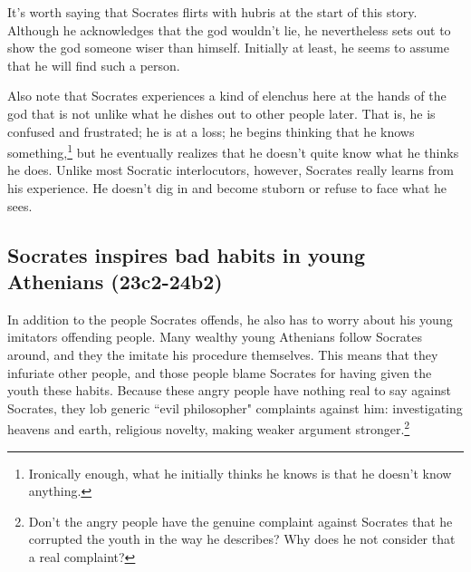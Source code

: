 \documentclass[11pt]{article}
\begin{document}
It's worth saying that Socrates flirts with hubris at the start of this
story.  Although he acknowledges that the god wouldn't lie, he nevertheless
sets out to show the god someone wiser than himself.  Initially at least,
he seems to assume that he will find such a person.

Also note that Socrates experiences a kind of elenchus here at the hands of
the god that is not unlike what he dishes out to other people later. That
is, he is confused and frustrated; he is at a loss; he begins thinking that
he knows something,\footnote{Ironically enough, what he initially thinks he
knows is that he doesn't know anything.} but he eventually realizes that
he doesn't quite know what he thinks he does.  Unlike most Socratic
interlocutors, however, Socrates really learns from his experience.  He
doesn't dig in and become stuborn or refuse to face what he sees.

\subsection{Socrates inspires bad habits in young Athenians (23c2-24b2)}

In addition to the people Socrates offends, he also has to worry about his
young imitators offending people.  Many wealthy young Athenians follow
Socrates around, and they the imitate his procedure themselves. This means
that they infuriate other people, and those people blame Socrates for
having given the youth these habits.  Because these angry people have
nothing real to say against Socrates, they lob generic ``evil philosopher"
complaints against him: investigating heavens and earth, religious novelty,
making weaker argument stronger.\footnote{Don't the angry people have the
genuine complaint against Socrates that he corrupted the youth in the way
he describes? Why does he not consider that a real complaint?}






\newpage


\end{document}
